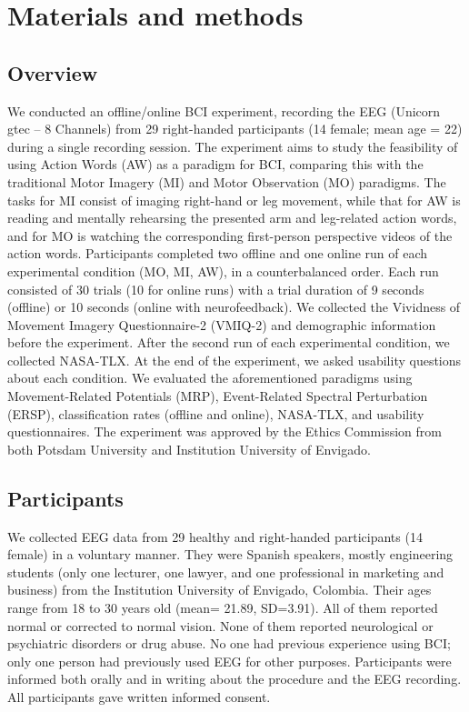\documentclass[10pt,letterpaper]{article}
\begin{document}
\section*{Materials and methods}

\subsection{Overview}


We conducted an offline/online BCI experiment, recording the EEG (Unicorn gtec – 8 Channels) from 29 right-handed participants (14 female; mean age = 22) during a single recording session. The experiment aims to study the feasibility of using Action Words (AW) as a paradigm for BCI, comparing this with the traditional Motor Imagery (MI) and Motor Observation (MO) paradigms. The tasks for MI consist of imaging right-hand or leg movement, while that for AW is reading and mentally rehearsing the presented arm and leg-related action words, and for MO is watching the corresponding first-person perspective videos of the action words. Participants completed two offline and one online run of each experimental condition (MO, MI, AW), in a counterbalanced order. Each run consisted of 30 trials (10 for online runs) with a trial duration of 9 seconds (offline) or 10 seconds (online with neurofeedback). We collected the Vividness of Movement Imagery Questionnaire-2 (VMIQ-2) and demographic information before the experiment. After the second run of each experimental condition, we collected NASA-TLX. At the end of the experiment, we asked usability questions about each condition. We evaluated the aforementioned paradigms using  Movement-Related Potentials (MRP), Event-Related Spectral Perturbation (ERSP), classification rates (offline and online), NASA-TLX, and usability questionnaires. The experiment was approved by the Ethics Commission from both Potsdam University and Institution University of Envigado.


\subsection{Participants}
We collected EEG data from 29 healthy and right-handed participants (14 female) in a voluntary manner. They were Spanish speakers, mostly engineering students (only one lecturer, one lawyer, and one professional in marketing and business) from the Institution University of Envigado, Colombia. Their ages range from 18 to 30 years old (mean= 21.89, SD=3.91). All of them reported normal or corrected to normal vision. None of them reported neurological or psychiatric disorders or drug abuse. No one had previous experience using BCI; only one person had previously used EEG for other purposes. Participants were informed both orally and in writing about the procedure and the EEG recording. All participants gave written informed consent.
\end{document}
